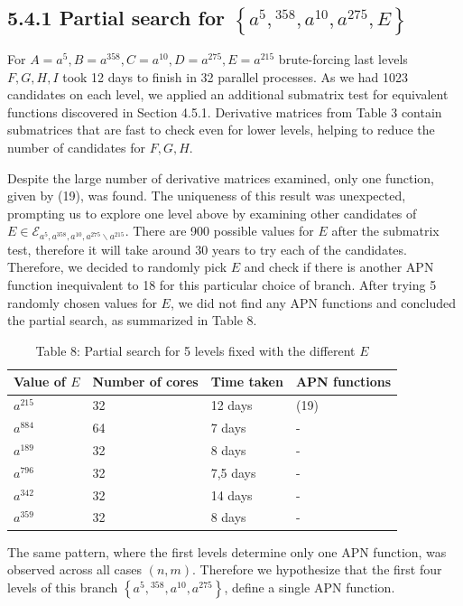 \documentclass[10pt]{article}
\begin{document}
\subsection*{5.4.1 Partial search for $\left\{a^{5},{ }^{358}, a^{10}, a^{275}, E\right\}$}
For $A=a^{5}, B=a^{358}, C=a^{10}, D=a^{275}, E=a^{215}$ brute-forcing last levels $F, G, H, I$ took 12 days to finish in 32 parallel processes. As we had 1023 candidates on each level, we applied an additional submatrix test for equivalent functions discovered in Section 4.5.1. Derivative matrices from Table 3 contain submatrices that are fast to check even for lower levels, helping to reduce the number of candidates for $F, G, H$.

Despite the large number of derivative matrices examined, only one function, given by (19), was found. The uniqueness of this result was unexpected, prompting us to explore one level above by examining other candidates of $E \in \mathcal{E}_{a^{5}, a^{358}, a^{10}, a^{275} \backslash a^{215}}$. There are 900 possible values for $E$ after the submatrix test, therefore it will take around 30 years to try each of the candidates. Therefore, we decided to randomly pick $E$ and check if there is another APN function inequivalent to 18 for this particular choice of branch. After trying 5 randomly chosen values for $E$, we did not find any APN functions and concluded the partial search, as summarized in Table 8.

\begin{table}[h]
\begin{center}
\begin{tabular}{|l|l|l|l|}
\hline
Value of $E$ & Number of cores & Time taken & APN functions \\
\hline
$a^{215}$ & 32 & 12 days & (19) \\
\hline
$a^{884}$ & 64 & 7 days & - \\
\hline
$a^{189}$ & 32 & 8 days & - \\
\hline
$a^{796}$ & 32 & 7,5 days & - \\
\hline
$a^{342}$ & 32 & 14 days & - \\
\hline
$a^{359}$ & 32 & 8 days & - \\
\hline
\end{tabular}
\captionsetup{labelformat=empty}
\caption{Table 8: Partial search for 5 levels fixed with the different $E$}
\end{center}
\end{table}

The same pattern, where the first levels determine only one APN function, was observed across all cases $(n, m)$. Therefore we hypothesize that the first four levels of this branch $\left\{a^{5},{ }^{358}, a^{10}, a^{275}\right\}$, define a single APN function.
\end{document}
